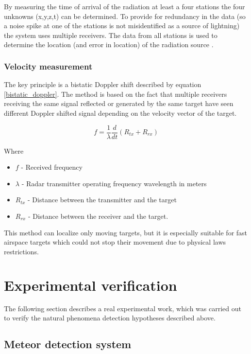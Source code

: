 \documentclass[twoside]{ctuthesis}
\theoremstyle{plain}
\theoremstyle{definition}
\theoremstyle{note}
\begin{document}
By measuring the time of arrival of the radiation at least a four stations the four unknowns (x,y,z,t) can be determined. To provide for redundancy in the data (so a noise spike at one of the stations is not misidentified as a source of lightning) the system uses multiple receivers. The data from all stations is used to determine the location (and error in location) of the radiation source \cite{NMLMA}.

\subsection{Velocity measurement}

The key principle is a bistatic Doppler shift described by equation \ref{bistatic_doppler}. The method is based on the fact that multiple receivers receiving the same signal reflected or generated by the same target have seen different Doppler shifted signal depending on the velocity vector of the target.  

\begin{equation}
f = \frac{1}{\lambda} \frac{d}{dt} \left( R_{tx} + R_{rx} \right)
\label{bistatic_doppler}
\end{equation}

Where 
\begin{itemize}
\item $f$ - Received frequency
\item $\lambda$ - Radar transmitter operating frequency wavelength in meters
\item $R_{tx}$ - Distance between the transmitter and the target
\item $R_{rx}$ - Distance between the receiver and the target.
\end{itemize}

This method can localize only moving targets, but it is especially suitable for fast airspace targets which could not stop their movement due to physical laws restrictions. 

\chapter{Experimental verification}

The following section describes a real experimental work, which was carried out to verify the natural phenomena detection hypotheses described above. 

\section{Meteor detection system}
\end{document}
